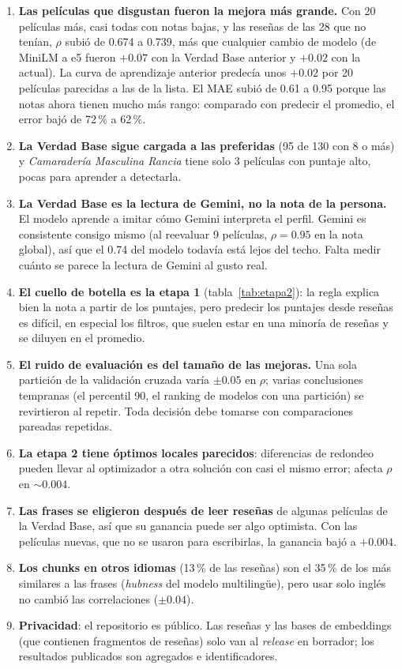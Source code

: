 \documentclass[11pt,a4paper]{article}
\begin{document}
\begin{enumerate}
  \item \textbf{Las películas que disgustan fueron la mejora más grande.} Con 20 películas más, casi todas con notas
  bajas, y las reseñas de las 28 que no tenían, $\rho$ subió de 0.674 a 0.739, más que cualquier cambio de modelo
  (de MiniLM a e5 fueron $+0.07$ con la Verdad Base anterior y $+0.02$ con la actual). La curva de aprendizaje anterior
  predecía unos $+0.02$ por 20 películas parecidas a las de la lista. El MAE subió de 0.61 a 0.95 porque las notas
  ahora tienen mucho más rango: comparado con predecir el promedio, el error bajó de 72\,\% a 62\,\%.
  \item \textbf{La Verdad Base sigue cargada a las preferidas} (95 de 130 con 8 o más) y \emph{Camaradería Masculina
  Rancia} tiene solo 3 películas con puntaje alto, pocas para aprender a detectarla.
  \item \textbf{La Verdad Base es la lectura de Gemini, no la nota de la persona.} El modelo aprende a imitar cómo
  Gemini interpreta el perfil. Gemini es consistente consigo mismo (al reevaluar 9 películas, $\rho=0.95$ en la nota
  global), así que el 0.74 del modelo todavía está lejos del techo. Falta medir cuánto se parece la lectura de Gemini
  al gusto real.
  \item \textbf{El cuello de botella es la etapa 1} (tabla~\ref{tab:etapa2}): la regla explica bien la nota a partir de
  los puntajes, pero predecir los puntajes desde reseñas es difícil, en especial los filtros, que suelen estar en una
  minoría de reseñas y se diluyen en el promedio.
  \item \textbf{El ruido de evaluación es del tamaño de las mejoras.} Una sola partición de la validación cruzada varía
  $\pm0.05$ en $\rho$; varias conclusiones tempranas (el percentil 90, el ranking de modelos con una partición) se
  revirtieron al repetir. Toda decisión debe tomarse con comparaciones pareadas repetidas.
  \item \textbf{La etapa 2 tiene óptimos locales parecidos}: diferencias de redondeo pueden llevar al optimizador a otra
  solución con casi el mismo error; afecta $\rho$ en $\sim0.004$.
  \item \textbf{Las frases se eligieron después de leer reseñas} de algunas películas de la Verdad Base, así que su
  ganancia puede ser algo optimista. Con las películas nuevas, que no se usaron para escribirlas, la ganancia bajó a
  $+0.004$.
  \item \textbf{Los chunks en otros idiomas} (13\,\% de las reseñas) son el 35\,\% de los más similares a las frases
  (\emph{hubness} del modelo multilingüe), pero usar solo inglés no cambió las correlaciones ($\pm0.04$).
  \item \textbf{Privacidad}: el repositorio es público. Las reseñas y las bases de embeddings (que contienen fragmentos
  de reseñas) solo van al \emph{release} en borrador; los resultados publicados son agregados e identificadores.
\end{enumerate}
\end{document}
